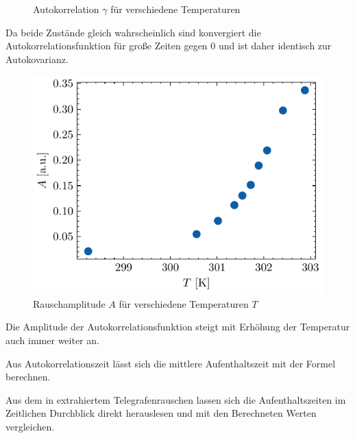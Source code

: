 \documentclass[main.tex]{subfiles}
\begin{document}
\begin{figure}[H]
    \caption{Autokorrelation $\gamma$ für verschiedene Temperaturen }\label{fig:temp-autocorr}
\end{figure}

Da beide Zustände gleich wahrscheinlich sind konvergiert die Autokorrelationsfunktion für große Zeiten gegen 0 und ist daher identisch zur Autokovarianz. 


\begin{figure}[H]
    \centering
    \includegraphics{bilder/plots/temp_comparison_long/rauschamplitude.pdf}
    \caption{Rauschamplitude $A$ für verschiedene Temperaturen $T$ }\label{fig:temp-autocorr-amplitude}
\end{figure}

Die Amplitude der Autokorrelationsfunktion steigt mit Erhöhung der Temperatur auch immer weiter an.

Aus Autokorrelationszeit lässt sich die mittlere Aufenthaltszeit mit der Formel  berechnen.

Aus dem in extrahiertem Telegrafenrauschen lassen sich die Aufenthaltszeiten im Zeitlichen Durchblick direkt herauslesen und mit den Berechneten Werten vergleichen. 
\end{document}
